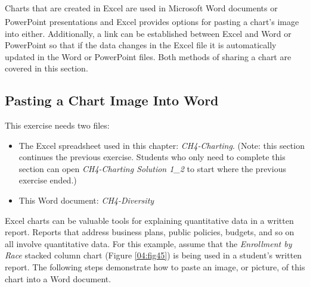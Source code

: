 Charts that are created in Excel are used in Microsoft Word\textsuperscript{\textregistered} documents or PowerPoint\textsuperscript{\textregistered} presentations and Excel provides options for pasting a chart's image into either. Additionally, a link can be established between Excel and Word or PowerPoint so that if the data changes in the Excel file it is automatically updated in the Word or PowerPoint files. Both methods of sharing a chart are covered in this section.

\subsection{Pasting a Chart Image Into Word}

This exercise needs two files:

\begin{itemize}
	\item The Excel spreadsheet used in this chapter: \textit{CH4-Charting}. (Note: this section continues the previous exercise. Students who only need to complete this section can open \textit{CH4-Charting Solution 1\_2} to start where the previous exercise ended.)
	\item This Word document: \textit{CH4-Diversity}
\end{itemize}

Excel charts can be valuable tools for explaining quantitative data in a written report. Reports that address business plans, public policies, budgets, and so on all involve quantitative data. For this example, assume that the \textit{Enrollment by Race} stacked column chart (Figure \ref{04:fig45}) is being used in a student's written report. The following steps demonstrate how to paste an image, or picture, of this chart into a Word document.

